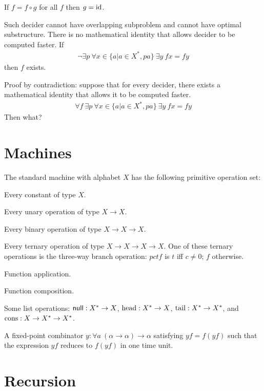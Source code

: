 \begin{mcon}
    If $f = f \circ g$ for all $f$ then $g = \operatorname{id}$.
\end{mcon}

\begin{mcon}
Such decider cannot have overlapping subproblem
and cannot have optimal substructure.
There is no mathematical identity that allows decider to be computed faster.
If
\begin{align}
    \neg\exists p ~ \forall x \in \{ a | a \in X^*, p a \} ~ \exists y ~ fx = fy
\end{align}
then $f$ exists.
\end{mcon}

Proof by contradiction:
suppose that for every decider,
there exists a mathematical identity that allows it to be computed faster.
\begin{align}
    \forall f ~ \exists p ~ \forall x \in \{ a | a \in X^*, p a \} ~ \exists y ~ fx = fy
\end{align}
Then what?

\section{Machines}

\begin{mdef}
    The standard machine with alphabet $X$
    has the following primitive operation set:

    Every constant of type $X$.

    Every unary operation of type $X \to X$.

    Every binary operation of type $X \to X \to X$.

    Every ternary operation of type $X \to X \to X \to X$.
    One of these ternary operations is the three-way branch operation:
    $pctf$ is $t$ iff $c \neq 0$; $f$ otherwise.

    Function application.

    Function composition.

    Some list operations: $\textsf{null} : X^* \to X$,
    $\operatorname{head} : X^* \to X$,
    $\operatorname{tail} : X^* \to X^*$,
    and $\operatorname{cons} : X \to X^* \to X^*$.

    A fixed-point combinator $y : \forall a ~ (\alpha \to \alpha) \to \alpha$ satisfying $yf = f(yf)$
    such that the expression $yf$ reduces to $f(yf)$ in one time unit.
\end{mdef}

\section{Recursion}

